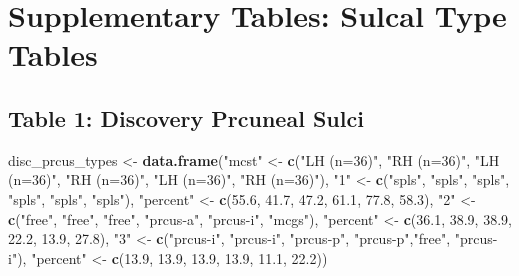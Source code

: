 \documentclass[
]{article}
\newenvironment{Shaded}{\begin{snugshade}}{\end{snugshade}}
\newcommand{\FloatTok}[1]{\textcolor[rgb]{0.00,0.00,0.81}{#1}}
\newcommand{\KeywordTok}[1]{\textcolor[rgb]{0.13,0.29,0.53}{\textbf{#1}}}
\newcommand{\NormalTok}[1]{#1}
\newcommand{\StringTok}[1]{\textcolor[rgb]{0.31,0.60,0.02}{#1}}
\begin{document}
\hypertarget{supplementary-tables-sulcal-type-tables}{%
\section{Supplementary Tables: Sulcal Type
Tables}\label{supplementary-tables-sulcal-type-tables}}

\hypertarget{table-1-discovery-prcuneal-sulci}{%
\subsection{Table 1: Discovery Prcuneal
Sulci}\label{table-1-discovery-prcuneal-sulci}}

\begin{Shaded}
\begin{Highlighting}[]
\NormalTok{disc_prcus_types <-}\StringTok{ }\KeywordTok{data.frame}\NormalTok{(}\StringTok{"mcst"}\NormalTok{ <-}\StringTok{ }\KeywordTok{c}\NormalTok{(}\StringTok{"LH (n=36)"}\NormalTok{, }\StringTok{"RH (n=36)"}\NormalTok{, }\StringTok{"LH (n=36)"}\NormalTok{, }\StringTok{"RH (n=36)"}\NormalTok{, }\StringTok{"LH (n=36)"}\NormalTok{, }\StringTok{"RH (n=36)"}\NormalTok{),}
                              \StringTok{"1"}\NormalTok{ <-}\StringTok{ }\KeywordTok{c}\NormalTok{(}\StringTok{"spls"}\NormalTok{, }\StringTok{"spls"}\NormalTok{,    }\StringTok{"spls"}\NormalTok{, }\StringTok{"spls"}\NormalTok{,    }\StringTok{"spls"}\NormalTok{, }\StringTok{"spls"}\NormalTok{),}
                              \StringTok{"percent"}\NormalTok{ <-}\StringTok{ }\KeywordTok{c}\NormalTok{(}\FloatTok{55.6}\NormalTok{, }\FloatTok{41.7}\NormalTok{,   }\FloatTok{47.2}\NormalTok{, }\FloatTok{61.1}\NormalTok{,        }\FloatTok{77.8}\NormalTok{, }\FloatTok{58.3}\NormalTok{),}
                              \StringTok{"2"}\NormalTok{ <-}\StringTok{ }\KeywordTok{c}\NormalTok{(}\StringTok{"free"}\NormalTok{, }\StringTok{"free"}\NormalTok{,    }\StringTok{"free"}\NormalTok{, }\StringTok{"prcus-a"}\NormalTok{,    }\StringTok{"prcus-i"}\NormalTok{, }\StringTok{"mcgs"}\NormalTok{),}
                              \StringTok{"percent"}\NormalTok{ <-}\StringTok{ }\KeywordTok{c}\NormalTok{(}\FloatTok{36.1}\NormalTok{, }\FloatTok{38.9}\NormalTok{,   }\FloatTok{38.9}\NormalTok{, }\FloatTok{22.2}\NormalTok{,           }\FloatTok{13.9}\NormalTok{, }\FloatTok{27.8}\NormalTok{),}
                              \StringTok{"3"}\NormalTok{ <-}\StringTok{ }\KeywordTok{c}\NormalTok{(}\StringTok{"prcus-i"}\NormalTok{, }\StringTok{"prcus-i"}\NormalTok{,  }\StringTok{"prcus-p"}\NormalTok{, }\StringTok{"prcus-p"}\NormalTok{,}\StringTok{"free"}\NormalTok{, }\StringTok{"prcus-i"}\NormalTok{),}
                              \StringTok{"percent"}\NormalTok{ <-}\StringTok{ }\KeywordTok{c}\NormalTok{(}\FloatTok{13.9}\NormalTok{, }\FloatTok{13.9}\NormalTok{,        }\FloatTok{13.9}\NormalTok{, }\FloatTok{13.9}\NormalTok{,           }\FloatTok{11.1}\NormalTok{, }\FloatTok{22.2}\NormalTok{))}


\end{Highlighting}
\end{Shaded}
\end{document}
